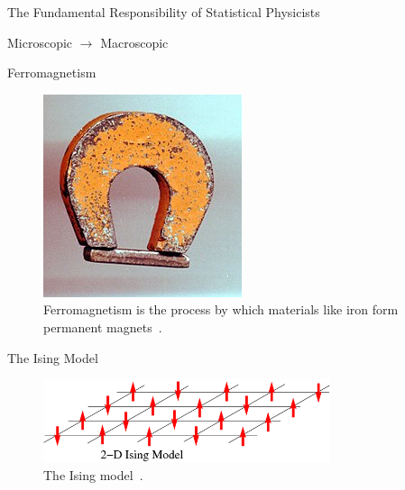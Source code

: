 \documentclass{beamer}
\begin{document}
\begin{frame}{The Fundamental Responsibility of Statistical Physicists}


  {\Huge Microscopic $\rightarrow$ Macroscopic}
\end{frame}

\begin{frame}{Ferromagnetism}
  \begin{figure}[ht]
    \centering
    \includegraphics[width=0.5\linewidth]{figures/magnet.jpg}
    \caption{Ferromagnetism is the process by which materials like
      iron form permanent magnets~\cite{magnet}.}
  \end{figure}
\end{frame}


\begin{frame}{The Ising Model}
  \begin{figure}[ht]
    \centering
    \includegraphics[width=0.75\textwidth]{figures/ising.png}
    \caption{The Ising model~\cite{ising}.\label{fig:ising} }
  \end{figure}
\end{frame}
\end{document}

